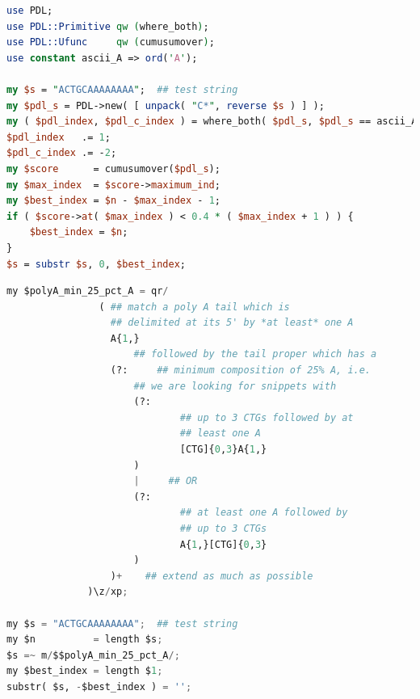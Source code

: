 \documentclass[10pt]{article}
\begin{document}
\noindent\hspace{0.08\linewidth}\begin{minipage}{0.84\textwidth}
\begin{lstlisting}[language=Perl,basicstyle=\footnotesize,frame=none,caption={Perl code for a modified \texttt{cutadapt} that uses \texttt{PDL}.},label={lst:CutadaptInPDL},captionpos=b]
use PDL;
use PDL::Primitive qw (where_both);
use PDL::Ufunc     qw (cumusumover);
use constant ascii_A => ord('A');

my $s = "ACTGCAAAAAAAA";  ## test string   
my $pdl_s = PDL->new( [ unpack( "C*", reverse $s ) ] );
my ( $pdl_index, $pdl_c_index ) = where_both( $pdl_s, $pdl_s == ascii_A );
$pdl_index   .= 1;
$pdl_c_index .= -2;
my $score      = cumusumover($pdl_s);
my $max_index  = $score->maximum_ind;
my $best_index = $n - $max_index - 1;
if ( $score->at( $max_index ) < 0.4 * ( $max_index + 1 ) ) {
    $best_index = $n;
}
$s = substr $s, 0, $best_index;
\end{lstlisting}
\end{minipage}

\noindent\hspace{0.15\linewidth}\begin{minipage}{0.70\textwidth}
\begin{lstlisting}[language=Python,basicstyle=\footnotesize,frame=none,caption={A regex for \texttt{cutadapt}.},label={lst:CutadaptAsRegex},captionpos=b]
my $polyA_min_25_pct_A = qr/
                ( ## match a poly A tail which is 
                  ## delimited at its 5' by *at least* one A
                  A{1,}
                      ## followed by the tail proper which has a    
                  (?:     ## minimum composition of 25% A, i.e.
                      ## we are looking for snippets with 
                      (?: 
                              ## up to 3 CTGs followed by at 
                              ## least one A
                              [CTG]{0,3}A{1,}    
                      )
                      |     ## OR
                      (?: 
                              ## at least one A followed by 
                              ## up to 3 CTGs
                              A{1,}[CTG]{0,3}
                      )
                  )+    ## extend as much as possible
              )\z/xp;

my $s = "ACTGCAAAAAAAA";  ## test string              
my $n          = length $s;
$s =~ m/$$polyA_min_25_pct_A/;
my $best_index = length $1;
substr( $s, -$best_index ) = '';
    
\end{lstlisting}
\end{minipage}
\end{document}
